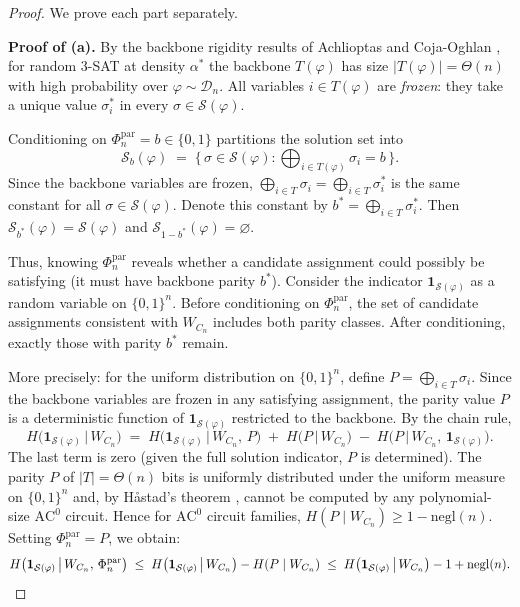 \documentclass[11pt]{article}
\theoremstyle{definition}
\begin{document}
\begin{proof}
We prove each part separately.

\medskip
\noindent\textbf{Proof of (a).}
By the backbone rigidity results of Achlioptas and Coja-Oghlan \cite{ART},
for random 3-SAT at density $\alpha^*$ the backbone $T(\varphi)$ has size
$|T(\varphi)| = \Theta(n)$ with high probability over $\varphi \sim \mathcal{D}_n$.
All variables $i \in T(\varphi)$ are \emph{frozen}: they take a unique value $\sigma_i^*$
in every $\sigma \in \mathcal{S}(\varphi)$.

Conditioning on $\Phi_n^{\mathrm{par}} = b \in \{0,1\}$ partitions the solution set into
\[
  \mathcal{S}_b(\varphi)
  \;=\;
  \bigl\{\, \sigma \in \mathcal{S}(\varphi) : \bigoplus_{i \in T(\varphi)} \sigma_i = b \,\bigr\}.
\]
Since the backbone variables are frozen, $\bigoplus_{i \in T} \sigma_i = \bigoplus_{i \in T} \sigma_i^*$
is the same constant for all $\sigma \in \mathcal{S}(\varphi)$.
Denote this constant by $b^* = \bigoplus_{i \in T} \sigma_i^*$.
Then $\mathcal{S}_{b^*}(\varphi) = \mathcal{S}(\varphi)$ and $\mathcal{S}_{1-b^*}(\varphi) = \varnothing$.

Thus, knowing $\Phi_n^{\mathrm{par}}$ reveals whether a candidate assignment could possibly
be satisfying (it must have backbone parity $b^*$).
Consider the indicator $\mathbf{1}_{\mathcal{S}(\varphi)}$ as a random variable on $\{0,1\}^n$.
Before conditioning on $\Phi_n^{\mathrm{par}}$, the set of candidate assignments consistent
with $W_{C_n}$ includes both parity classes.
After conditioning, exactly those with parity $b^*$ remain.

More precisely: for the uniform distribution on $\{0,1\}^n$, define
$P = \bigoplus_{i \in T} \sigma_i$.  Since the backbone variables are frozen in any
satisfying assignment, the parity value $P$ is a deterministic function of
$\mathbf{1}_{\mathcal{S}(\varphi)}$ restricted to the backbone.
By the chain rule,
\[
  H\bigl(\mathbf{1}_{\mathcal{S}(\varphi)} \,\big|\, W_{C_n}\bigr)
  \;=\;
  H\bigl(\mathbf{1}_{\mathcal{S}(\varphi)} \,\big|\, W_{C_n},\, P\bigr)
  \;+\;
  H\bigl(P \,\big|\, W_{C_n}\bigr)
  \;-\;
  H\bigl(P \,\big|\, W_{C_n},\, \mathbf{1}_{\mathcal{S}(\varphi)}\bigr).
\]
The last term is zero (given the full solution indicator, $P$ is determined).
The parity $P$ of $|T| = \Theta(n)$ bits is uniformly distributed under the
uniform measure on $\{0,1\}^n$ and, by H\aa{}stad's theorem \cite{Hastad},
cannot be computed by any polynomial-size $\mathrm{AC}^0$ circuit.
Hence for $\mathrm{AC}^0$ circuit families, $H(P \mid W_{C_n}) \geq 1 - \mathrm{negl}(n)$.
Setting $\Phi_n^{\mathrm{par}} = P$, we obtain:
\[
  H\bigl(\mathbf{1}_{\mathcal{S}(\varphi)} \,\big|\, W_{C_n},\, \Phi_n^{\mathrm{par}}\bigr)
  \;\leq\;
  H\bigl(\mathbf{1}_{\mathcal{S}(\varphi)} \,\big|\, W_{C_n}\bigr)
  - H(P \mid W_{C_n})
  \;\leq\;
  H\bigl(\mathbf{1}_{\mathcal{S}(\varphi)} \,\big|\, W_{C_n}\bigr) - 1 + \mathrm{negl}(n). \qedhere
\]


\end{proof}
\end{document}
